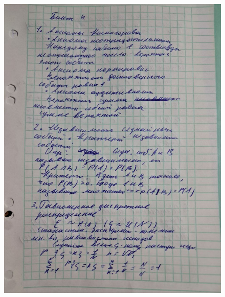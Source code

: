 \documentclass{article}
\begin{document}
\begin{figure}[H]
    \centering
    \includegraphics[width=1\linewidth]{photo_5323477539961828017_y.jpg}
\end{figure}
\end{document}
